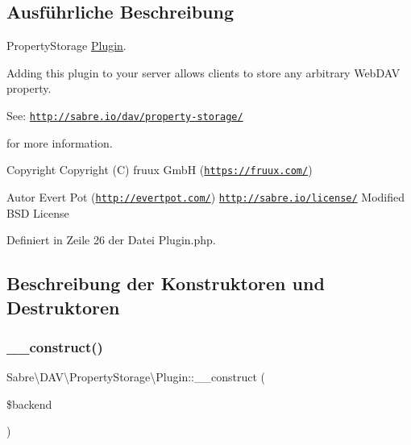 \subsection{Ausführliche Beschreibung}
Property\+Storage \mbox{\hyperlink{class_sabre_1_1_d_a_v_1_1_property_storage_1_1_plugin}{Plugin}}.

Adding this plugin to your server allows clients to store any arbitrary Web\+D\+AV property.

See\+: \href{http://sabre.io/dav/property-storage/}{\tt http\+://sabre.\+io/dav/property-\/storage/}

for more information.

\begin{DoxyCopyright}{Copyright}
Copyright (C) fruux GmbH (\href{https://fruux.com/}{\tt https\+://fruux.\+com/}) 
\end{DoxyCopyright}
\begin{DoxyAuthor}{Autor}
Evert Pot (\href{http://evertpot.com/}{\tt http\+://evertpot.\+com/})  \href{http://sabre.io/license/}{\tt http\+://sabre.\+io/license/} Modified B\+SD License 
\end{DoxyAuthor}


Definiert in Zeile 26 der Datei Plugin.\+php.



\subsection{Beschreibung der Konstruktoren und Destruktoren}
\mbox{\label{class_sabre_1_1_d_a_v_1_1_property_storage_1_1_plugin_a5765023c0b1df922ce56fe20d6601d54}} 
\subsubsection{\texorpdfstring{\+\_\+\+\_\+construct()}{\_\_construct()}}
{\footnotesize\ttfamily Sabre\textbackslash{}\+D\+A\+V\textbackslash{}\+Property\+Storage\textbackslash{}\+Plugin\+::\+\_\+\+\_\+construct (\begin{DoxyParamCaption}\item[{\mbox{\hyperlink{interface_sabre_1_1_d_a_v_1_1_property_storage_1_1_backend_1_1_backend_interface}{Backend\textbackslash{}\+Backend\+Interface}}}]{\$backend }\end{DoxyParamCaption})}

